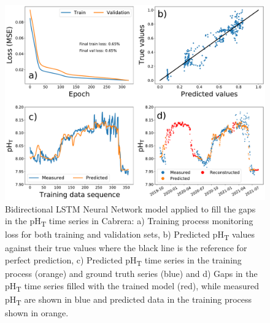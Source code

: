\begin{figure}[H]
    \centering

    \includegraphics[width=\textwidth]{Figures/bidirectional_LSTM_gap_filling.pdf}
    \caption{Bidirectional LSTM Neural Network model applied to fill the
        gaps in the pH\textsubscript{T} time series in Cabrera: a) Training
        process
        monitoring loss for both training and validation sets, b) Predicted
        pH\textsubscript{T} values against their true values where the black
        line is
        the reference for perfect prediction, c) Predicted pH\textsubscript{T}
        time
        series in the training process (orange) and ground truth series (blue)
        and d)
        Gaps in the pH\textsubscript{T} time series filled with the trained
        model
        (red), while measured pH\textsubscript{T} are shown in blue and
        predicted data
        in the training process shown in orange.}
    \label{fig:Cabrera_gap_filling}
\end{figure}

